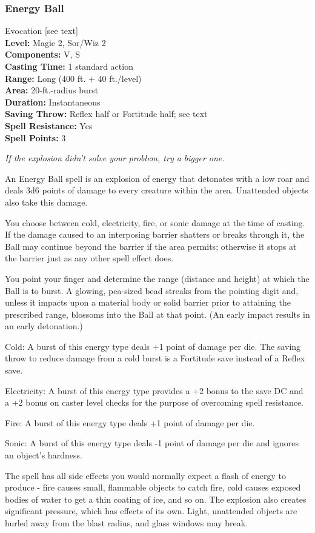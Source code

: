 \subsubsection{Energy Ball}
\label{Spell:EnergyBall}
Evocation [see text]
\\ \textbf{Level:} Magic 2, Sor/Wiz 2
\\ \textbf{Components:} V, S
\\ \textbf{Casting Time:} 1 standard action
\\ \textbf{Range:} Long (400 ft. + 40 ft./level)
\\ \textbf{Area:} 20-ft.-radius burst
\\ \textbf{Duration:} Instantaneous
\\ \textbf{Saving Throw:} Reflex half or Fortitude half; see text
\\ \textbf{Spell Resistance:} Yes
\\ \textbf{Spell Points:} 3

\emph{If the explosion didn't solve your problem, try a bigger one.}

An Energy Ball spell is an explosion of energy that detonates with a low roar and deals 3d6 points of damage to every creature within the area. 
Unattended objects also take this damage. 

You choose between cold, electricity, fire, or sonic damage at the time of casting.
If the damage caused to an interposing barrier shatters or breaks through it, the Ball may continue beyond the barrier if the area permits; 
otherwise it stops at the barrier just as any other spell effect does. 

You point your finger and determine the range (distance and height) at which the Ball is to burst. 
A glowing, pea-sized bead streaks from the pointing digit and, unless it impacts upon a material body or solid barrier prior to attaining the prescribed range, 
blossoms into the Ball at that point. (An early impact results in an early detonation.)

\begin{list}{}{\leftmargin=1em}
 \item Cold: A burst of this energy type deals +1 point of damage per die. 
 The saving throw to reduce damage from a cold burst is a Fortitude save instead of a Reflex save.
 \item Electricity: A burst of this energy type provides a +2 bonus to the save DC
 and a +2 bonus on caster level checks for the purpose of overcoming spell resistance.
 \item Fire: A burst of this energy type deals +1 point of damage per die.
 \item Sonic: A burst of this energy type deals -1 point of damage per die and ignores an object's hardness.
\end{list}
The spell has all side effects you would normally expect a flash of energy to produce - fire causes small, flammable objects to catch fire, cold causes exposed bodies of water to get a thin coating of ice, and so on.
The explosion also creates significant pressure, which has effects of its own. 
Light, unattended objects are hurled away from the blast radius, and glass windows may break.

